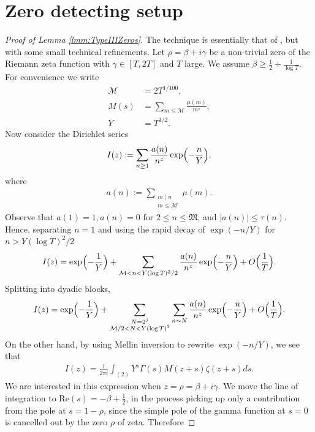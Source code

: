 \documentclass[12pt]{amsart}
\theoremstyle{plain}
\theoremstyle{definition}
\theoremstyle{remark}
\begin{document}
\section{Zero detecting setup}\label{sec:ZeroDetection}
\begin{proof}[Proof of Lemma \ref{lmm:TypeIIIZeros}]
The technique is essentially that of \cite[Chapter 12]{Mon1971}, but with some small technical refinements. Let $\rho = \beta+i\gamma$ be a non-trivial zero of the Riemann zeta function with $\gamma \in [T,2T]$ and $T$ large. We assume $\beta \geq \frac{1}{2} + \frac{1}{\log T}$. For convenience we write
\begin{align*}
\mathcal{M} &= 2T^{1/100},\\
M(s) &= \sum_{m \leq \mathcal{M}} \frac{\mu(m)}{m^s},\\
Y&=T^{1/2}.
\end{align*}
Now consider the Dirichlet series
\begin{align*}
I(z) := \sum_{n\geq 1} \frac{a(n)}{n^z}\exp \Bigl( -\frac{n}{Y}\Bigr),
\end{align*}
where
\begin{align*}
a(n) := \sum_{\substack{m \mid n \\ m \leq \mathcal{M}}} \mu(m).
\end{align*}
Observe that $a(1)=1, a(n)=0$ for $2 \leq n\leq \mathfrak{M}$, and $|a(n)|\leq \tau(n)$. Hence, separating $n=1$ and using the rapid decay of $\exp(-n/Y)$ for $n>Y(\log{T})^2/2$
\begin{align*}
I(z) = \exp \Bigl( -\frac{1}{Y}\Bigr)+ \sum_{\mathcal{M}<n<Y(\log{T})^2/2} \frac{a(n)}{n^z}\exp \Bigl( -\frac{n}{Y}\Bigr)+O\Bigl(\frac{1}{T}\Bigr).
\end{align*}
Splitting into dyadic blocks,
\[
I(z)=\exp \Bigl( -\frac{1}{Y}\Bigr)+\sum_{\substack{N=2^j\\ \mathcal{M}/2<N<Y(\log{T})^2}}\sum_{n \sim N}\frac{a(n)}{n^z}\exp \Bigl( -\frac{n}{Y}\Bigr) + O\Bigl(\frac{1}{T}\Bigr).
\]
On the other hand, by using Mellin inversion to rewrite $\exp (-n/Y)$, we see that
\begin{align*}
I(z) = \frac{1}{2\pi i} \int_{(2)} Y^s \Gamma(s) M(z+s)\zeta(z+s) ds.
\end{align*}
We are interested in this expression when $z=\rho=\beta+i\gamma$. We move the line of integration to $\text{Re}(s) = -\beta + \frac{1}{2}$, in the process picking up only a contribution from the pole at $s = 1-\rho$, since the simple pole of the gamma function at $s=0$ is cancelled out by the zero $\rho$ of zeta. Therefore

\end{proof}
\end{document}
